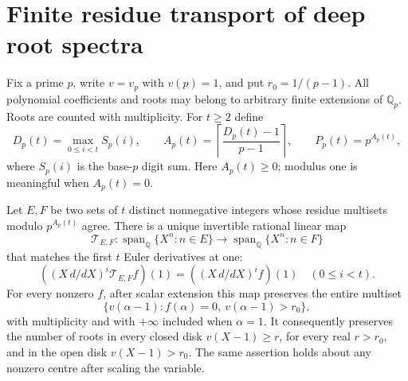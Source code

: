 \section{Finite residue transport of deep root spectra}
Fix a prime $p$, write $v=v_p$ with $v(p)=1$, and put $r_0=1/(p-1)$.
All polynomial coefficients and roots may belong to arbitrary finite extensions
of $\mathbb Q_p$. Roots are counted with multiplicity. For $t\ge2$ define
\[
 D_p(t)=\max_{0\le i<t}S_p(i),\qquad
 A_p(t)=\left\lceil\frac{D_p(t)-1}{p-1}\right\rceil,\qquad P_p(t)=p^{A_p(t)},
\]
where $S_p(i)$ is the base-$p$ digit sum. Here $A_p(t)\ge0$; modulus one
is meaningful when $A_p(t)=0$.

\begin{theorem}\label{thm:transport}
Let $E,F$ be two sets of $t$ distinct nonnegative integers whose residue
multisets modulo $p^{A_p(t)}$ agree. There is a unique invertible rational
linear map
\[
 \mathcal T_{E,F}:\operatorname{span}_{\mathbb Q}\{X^n:n\in E\}
 \longrightarrow\operatorname{span}_{\mathbb Q}\{X^n:n\in F\}
\]
that matches the first $t$ Euler derivatives at one:
\[
 ((X\,d/dX)^i\mathcal T_{E,F}f)(1)=((X\,d/dX)^if)(1)
 \quad(0\le i<t).
\]
For every nonzero $f$, after scalar extension this map preserves the entire multiset
\[
 \{v(\alpha-1):f(\alpha)=0,\ v(\alpha-1)>r_0\},
\]
with multiplicity and with $+\infty$ included when $\alpha=1$.
It consequently preserves the number of roots in every closed disk
$v(X-1)\ge r$, for every real $r>r_0$, and in the open disk
$v(X-1)>r_0$. The same assertion holds about any nonzero centre after
scaling the variable.

\end{theorem}
